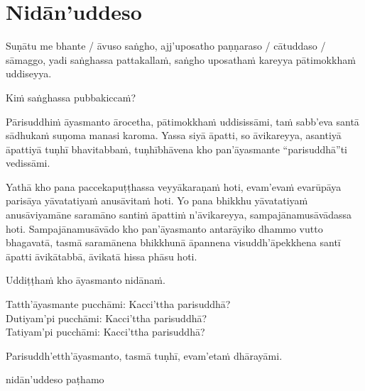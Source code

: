 \section{Nidān'uddeso}
\label{nidan'uddeso}

Suṇātu me bhante / āvuso saṅgho, ajj'uposatho paṇṇaraso / cātuddaso / sāmaggo, yadi saṅghassa pattakallaṁ, saṅgho uposathaṁ kareyya pātimokkhaṁ uddiseyya.

Kiṁ saṅghassa pubbakiccaṁ?

Pārisuddhiṁ āyasmanto ārocetha, pātimokkhaṁ uddisissāmi, taṁ sabb'eva santā sādhukaṁ suṇoma manasi karoma. Yassa siyā āpatti, so āvikareyya, asantiyā āpattiyā tuṇhī bhavitabbaṁ, tuṇhībhāvena kho pan'āyasmante “parisuddhā”ti vedissāmi.

Yathā kho pana paccekapuṭṭhassa veyyākaraṇaṁ hoti, evam'evaṁ evarūpāya parisāya yāvatatiyaṁ anusāvitaṁ hoti. Yo pana bhikkhu yāvatatiyaṁ anusāviyamāne saramāno santiṁ āpattiṁ n'āvikareyya, sampajānamusāvādassa hoti. Sampajānamusāvādo kho pan'āyasmanto antarāyiko dhammo vutto bhagavatā, tasmā saramānena bhikkhunā āpannena visuddh'āpekkhena santī āpatti āvikātabbā, āvikatā hissa phāsu hoti.

\medskip

\begin{center}
Uddiṭṭhaṁ kho āyasmanto nidānaṁ.

\smallskip

Tatth'āyasmante pucchāmi: Kacci'ttha parisuddhā?\\
Dutiyam'pi pucchāmi: Kacci'ttha parisuddhā?\\
Tatiyam'pi pucchāmi: Kacci'ttha parisuddhā?

\smallskip

Parisuddh'etth'āyasmanto, tasmā tuṇhī, evam'etaṁ dhārayāmi.
\end{center}

\begin{outro}
  nidān'uddeso paṭhamo
\end{outro}

\clearpage
